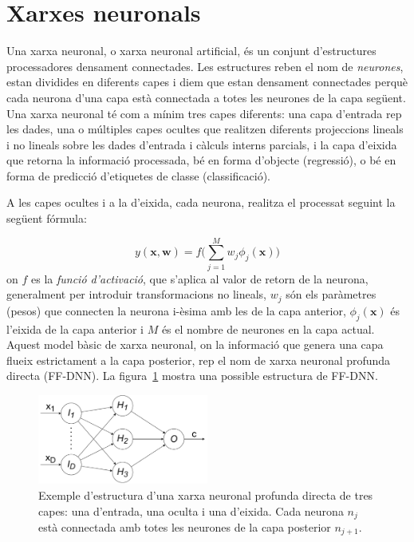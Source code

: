 \section{Xarxes neuronals}
\label{cap02_xarxes_neuronals}
Una xarxa neuronal, o xarxa neuronal artificial, és un conjunt d'estructures processadores densament connectades.
Les estructures reben el nom de \textit{neurones}, estan dividides en diferents capes i diem que estan densament connectades perquè cada neurona d'una capa està connectada a totes les neurones de la capa següent. 
Una xarxa neuronal té com a mínim tres capes diferents: una capa d'entrada rep les dades, una o múltiples capes ocultes que realitzen diferents projeccions lineals i no lineals sobre les dades d'entrada i càlculs interns parcials, i la capa d'eixida que retorna la informació processada, bé en forma d'objecte (regressió), o bé en forma de predicció d'etiquetes de classe (classificació).

A les capes ocultes i a la d'eixida, cada neurona, realitza el processat seguint la següent fórmula:

\begin{equation}
y(\textbf{x}, \textbf{w}) = f \Big( \sum_{j=1}^M w_j \phi_j(\textbf{x}) \Big)
\label{eq:prob_neurona}
\end{equation}
on $f$ es la \textit{funció d'activació}, que s'aplica al valor de retorn de la neurona, generalment per introduir transformacions no lineals, $w_j$ són els paràmetres (pesos) que connecten la neurona i-èsima amb les de la capa anterior, $\phi_j(\textbf{x})$ és l'eixida de la capa anterior i $M$ és el nombre de neurones en la capa actual.
Aquest model bàsic de xarxa neuronal, on la informació que genera una capa flueix estrictament a la capa posterior, rep el nom de xarxa neuronal profunda directa (FF-DNN). 
La figura~\ref{fig:estructura_fnn} mostra una possible estructura de FF-DNN.

\begin{figure}[ht!]
    \centering
    \includegraphics[width=0.5\textwidth]{figuras/estructura_fnn.pdf}
    \caption{Exemple d'estructura d'una xarxa neuronal profunda directa de tres capes: una d'entrada, una oculta i una d'eixida. Cada neurona $n_j$ està connectada amb totes les neurones de la capa posterior $n_{j+1}$.}
    \label{fig:estructura_fnn}
\end{figure}

